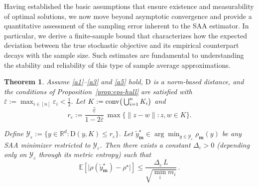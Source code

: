 \documentclass[letter,11pt, reqno]{amsart}
\newcommand{\R}{\mathbb{R}}
\newcommand{\D}{\mathrm{D}}
\newcommand{\conv}{{\rm conv}}
\renewcommand{\;}{\quad}
\theoremstyle{thmstyleone}%
\newtheorem{theorem}{Theorem}%
\theoremstyle{thmstyletwo}%
\theoremstyle{thmstylethree}%
\begin{document}
 Having established the basic assumptions that ensure existence and measurability of optimal solutions, we now move beyond asymptotic convergence and provide a quantitative assessment of the sampling error inherent to the SAA estimator. In particular, we derive a finite-sample bound that characterizes how the expected deviation between the true stochastic objective and its empirical counterpart decays with the sample size. Such estimates are fundamental to understanding the stability and reliability of this type of sample average approximations.
\begin{theorem}
\label{thm:finite-sample-epshull-detailed}
Assume \ref{a1}--\ref{a3} and \ref{a5} hold, $\D$ is a norm-based distance, and the conditions of Proposition~\ref{prop:eps-hull} are satisfied with 
$\bar\varepsilon:=\max_{i\in[n]}\varepsilon_i<\tfrac12$. 
Let $K:=\conv\big(\bigcup_{i=1}^n K_i\big)$ and 
\begin{equation*}
    r_{\varepsilon}:=\frac{\bar\varepsilon}{1-2\bar\varepsilon}\,\max\{\|z-w\|:z,w\in K\}. 
\end{equation*}

Define $\mathcal Y_\varepsilon:=\{y\in\R^d:\D(y,K)\le r_{\varepsilon}\}$.  
Let $\tilde y^\star_{\mathbf m}\in\arg\min_{y\in\mathcal Y_\varepsilon}\rho_{\mathbf m}(y)$ be any SAA minimizer restricted to $\mathcal Y_\varepsilon$. 
Then there exists a constant $\Delta_\varepsilon>0$ (depending only on $\mathcal Y_\varepsilon$ through its metric entropy) such that
\begin{equation*}
    \mathbb{E}\left[\big|\rho(\tilde y^\star_{\mathbf m})-\rho^\star\big|\right]
\le \frac{\Delta_\varepsilon\,L}{\sqrt{\min_i m_i}}\,.
\end{equation*}
\end{theorem}
\end{document}
